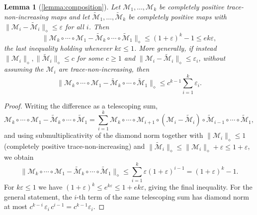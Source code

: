 \documentclass[aps,floatfix,10pt,amssymb,amsfont,amsmath,superscriptaddress,float,nofootinbib,longbibliography,nobalancelastpage,twocolumn]{revtex4-2}
\newtheorem*{lemma*}{Lemma}
\begin{document}
\begin{lemma*}[\ref{lemma:composition}]
Let $\mathcal{M}_1, \ldots, \mathcal{M}_k$ be completely positive trace-non-increasing maps and let $\tilde{\mathcal{M}}_1, \ldots, \tilde{\mathcal{M}}_k$ be completely positive maps with $\|\mathcal{M}_i - \tilde{\mathcal{M}}_i\|_{\diamond} \leq \varepsilon$ for all $i$. Then
\begin{equation}
    \|\mathcal{M}_k \circ \cdots \circ \mathcal{M}_1 - \tilde{\mathcal{M}}_k \circ \cdots \circ \tilde{\mathcal{M}}_1\|_{\diamond} \leq (1+\varepsilon)^k - 1 \leq e k \varepsilon,
\end{equation}
the last inequality holding whenever $k\varepsilon \leq 1$. More generally, if instead $\|\mathcal{M}_i\|_{\diamond}, \|\tilde{\mathcal{M}}_i\|_{\diamond} \leq c$ for some $c \geq 1$ and $\|\mathcal{M}_i - \tilde{\mathcal{M}}_i\|_{\diamond} \leq \varepsilon_i$, without assuming the $\mathcal{M}_i$ are trace-non-increasing, then
\begin{equation}
    \|\mathcal{M}_k \circ \cdots \circ \mathcal{M}_1 - \tilde{\mathcal{M}}_k \circ \cdots \circ \tilde{\mathcal{M}}_1\|_{\diamond} \leq c^{k-1}\sum_{i=1}^{k}\varepsilon_i .
\end{equation}
\end{lemma*}
\begin{proof}
    Writing the difference as a telescoping sum,
\begin{equation}
    \mathcal{M}_k \circ \cdots \circ \mathcal{M}_1 - \tilde{\mathcal{M}}_k \circ \cdots \circ \tilde{\mathcal{M}}_1 = \sum_{i=1}^{k} \mathcal{M}_k \circ \cdots \circ \mathcal{M}_{i+1} \circ (\mathcal{M}_i - \tilde{\mathcal{M}}_i) \circ \tilde{\mathcal{M}}_{i-1} \circ \cdots \circ \tilde{\mathcal{M}}_1,
\end{equation}
and using submultiplicativity of the diamond norm together with $\|\mathcal{M}_i\|_{\diamond} \leq 1$ (completely positive trace-non-increasing) and $\|\tilde{\mathcal{M}}_i\|_{\diamond} \leq \|\mathcal{M}_i\|_{\diamond} + \varepsilon \leq 1 + \varepsilon$, we obtain
\begin{equation}
    \|\mathcal{M}_k \circ \cdots \circ \mathcal{M}_1 - \tilde{\mathcal{M}}_k \circ \cdots \circ \tilde{\mathcal{M}}_1\|_{\diamond} \leq \sum_{i=1}^{k}\varepsilon(1+\varepsilon)^{i-1} = (1+\varepsilon)^k - 1.
\end{equation}
For $k\varepsilon \leq 1$ we have $(1+\varepsilon)^k \leq e^{k\varepsilon} \leq 1 + e k\varepsilon$, giving the final inequality. For the general statement, the $i$-th term of the same telescoping sum has diamond norm at most $c^{k-i}\,\varepsilon_i\,c^{i-1} = c^{k-1}\varepsilon_i$.
\end{proof}
\end{document}
